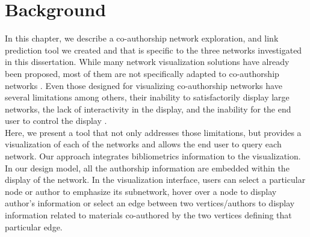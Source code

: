 

\label{chap_authorvis}
\section{Background}
In this chapter, we describe a co-authorship network exploration, and link prediction tool we created and that is specific to the three networks investigated in this dissertation. While many network visualization solutions have already been proposed, most of them are not specifically adapted to co-authorship networks \cite{nakazono_nel_2006,odoni_visualisation_2017,liu_toolkits_2004,horak_forcoa.net:_2011}. 
Even those designed for visualizing co-authorship networks have several limitations among others, their inability to satisfactorily display large networks, the lack of interactivity in the display, and the inability for the end user to control the display \cite{nakazono_nel_2006}.\\
Here, we present a tool that not only addresses those limitations, but provides a visualization of each of the networks and allows the end user to query each network. Our approach integrates bibliometrics information to the visualization. In our design model, all the authorship information are embedded within the display of the network. %
In the visualization interface, users can select a particular node or author to emphasize its subnetwork, hover over a node to display author's information or select an edge between two vertices/authors to display information related to materials co-authored by the two vertices defining that particular edge. 

